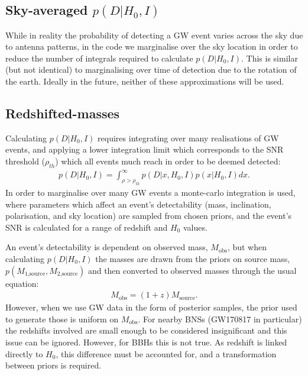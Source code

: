\documentclass[a4paper,10pt]{article}
\begin{document}
\subsection{Sky-averaged $p(D|H_0,I)$}
While in reality the probability of detecting a GW event varies across the sky due to antenna patterns, in the code we marginalise over the sky location in order to reduce the number of integrals required to calculate $p(D|H_0,I)$.  This is similar (but not identical) to marginalising over time of detection due to the rotation of the earth.  Ideally in the future, neither of these approximations will be used.


\subsection{Redshifted-masses}
Calculating $p(D|H_0,I)$ requires integrating over many realisations of GW events, and applying a lower integration limit which corresponds to the SNR threshold ($\rho_{th}$) which all events much reach in order to be deemed detected:
\begin{equation}
\begin{aligned}
p(D|H_0,I) = \int_{\rho>\rho_{th}}^\infty p(D|x,H_0,I)p(x|H_0,I)dx.
\end{aligned}
\end{equation}
In order to marginalise over many GW events a monte-carlo integration is used, where parameters which affect an event's detectability (mass, inclination, polarisation, and sky location) are sampled from chosen priors, and the event's SNR is calculated for a range of redshift and $H_0$ values.

An event's detectability is dependent on observed mass, $M_{\text{obs}}$, but when calculating $p(D|H_0,I)$ the masses are drawn from the priors on source mass, $p(M_{\text{1,source}},M_{\text{2,source}})$ and then converted to observed masses through the usual equation:
\begin{equation}
\begin{aligned}
M_{\text{obs}} = (1+z)M_{\text{source}}.
\end{aligned}
\end{equation}
However, when we use GW data in the form of posterior samples, the prior used to generate those is uniform on $M_{\text{obs}}$.  For nearby BNSs (GW170817 in particular) the redshifts involved are small enough to be considered insignificant and this issue can be ignored.  However, for BBHs this is not true.  As redshift is linked directly to $H_0$, this difference must be accounted for, and a transformation between priors is required.
\end{document}
